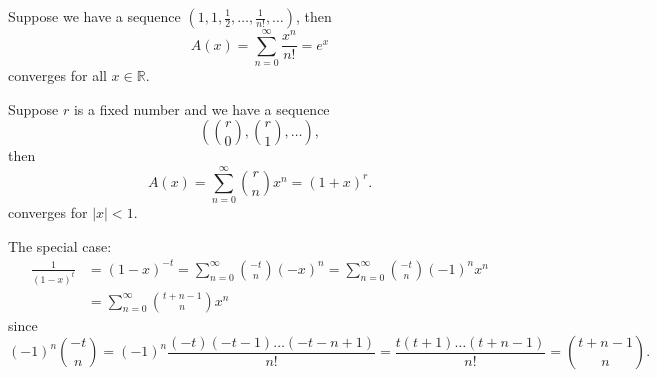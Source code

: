 \begin{eg}
    Suppose we have a sequence \(\left( 1, 1, \frac{1}{2}, \dots , \frac{1}{n!}, \dots  \right) \), then 
    \[
        A(x) = \sum_{n=0}^{\infty} \frac{x^n}{n!} = e^x
    \] converges for all \(x \in \mathbb{R} \).  
\end{eg}

\begin{eg}
    Suppose \(r\) is a fixed number and we have a sequence 
    \[
        \left( \binom{r}{0}, \binom{r}{1}, \dots  \right),
    \]then 
    \[
        A(x) = \sum_{n=0}^{\infty} \binom{r}{n} x^n = (1 + x)^r.  
    \] converges for \(\vert x \vert < 1 \).
\end{eg}

\begin{remark}
    The special case:
    \begin{align*}
        \frac{1}{(1 - x)^t} &= (1 - x)^{-t} = \sum_{n=0}^{\infty} \binom{-t}{n} (-x)^n = \sum_{n=0}^{\infty} \binom{-t}{n} (-1)^n x^n \\
        &= \sum_{n=0}^{\infty} \binom{t + n - 1}{n} x^n
    \end{align*} since 
    \[
        (-1)^n \binom{-t}{n} =(-1)^n \frac{(-t)(-t-1)\dots (-t-n+1)}{n!} = \frac{t(t+1)\dots (t+n-1)}{n!} = \binom{t+n-1}{n}.
    \]
\end{remark}

